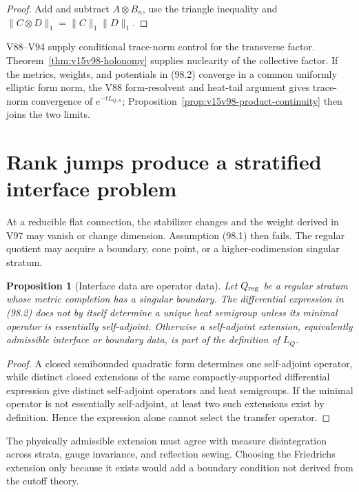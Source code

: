 \documentclass[11pt]{article}
\newtheorem{proposition}[theorem]{Proposition}
\theoremstyle{remark}
\begin{document}
\begin{proof}
Add and subtract \(A\otimes B_n\), use the triangle inequality and
\(\|C\otimes D\|_1=\|C\|_1\|D\|_1\).
\end{proof}

V88--V94 supply conditional trace-norm control for the transverse
factor.  Theorem~\ref{thm:v15v98-holonomy} supplies nuclearity of
the collective factor.  If the metrics, weights, and potentials in
(98.2) converge in a common uniformly elliptic form norm, the V88
form-resolvent and heat-tail argument gives trace-norm convergence
of \(e^{-tL_{Q,n}}\); Proposition~\ref{prop:v15v98-product-continuity}
then joins the two limits.

\section{Rank jumps produce a stratified interface problem}

At a reducible flat connection, the stabilizer changes and the
weight derived in V97 may vanish or change dimension.  Assumption
(98.1) then fails.  The regular quotient may acquire a boundary,
cone point, or a higher-codimension singular stratum.

\begin{proposition}[Interface data are operator data]
\label{prop:v15v98-interface}
Let \(Q_{\rm reg}\) be a regular stratum whose metric completion has
a singular boundary.  The differential expression in (98.2) does
not by itself determine a unique heat semigroup unless its minimal
operator is essentially self-adjoint.  Otherwise a self-adjoint
extension, equivalently admissible interface or boundary data, is
part of the definition of \(L_Q\).
\end{proposition}

\begin{proof}
A closed semibounded quadratic form determines one self-adjoint
operator, while distinct closed extensions of the same
compactly-supported differential expression give distinct
self-adjoint operators and heat semigroups.  If the minimal
operator is not essentially self-adjoint, at least two such
extensions exist by definition.  Hence the expression alone cannot
select the transfer operator.
\end{proof}

The physically admissible extension must agree with measure
disintegration across strata, gauge invariance, and reflection
sewing.  Choosing the Friedrichs extension only because it exists
would add a boundary condition not derived from the cutoff theory.
\end{document}
